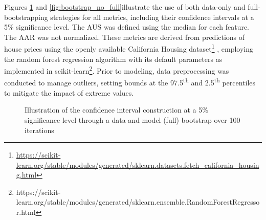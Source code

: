 Figures \ref{fig:bootstrap_full} and \ref{fig:bootstrap_no_full}illustrate the use of both data-only and full-bootstrapping strategies for all metrics, including their confidence intervals at a 5\% significance level. The AUS was defined using the median for each feature. The AAR was not normalized. These metrics are derived from predictions of house prices using the openly available California Housing dataset\footnote{\url{https://scikit-learn.org/stable/modules/generated/sklearn.datasets.fetch_california_housing.html}} , employing the random forest regression algorithm with its default parameters as implemented in scikit-learn\footnote{https://scikit-learn.org/stable/modules/generated/sklearn.ensemble.RandomForestRegressor.html}. Prior to modeling, data preprocessing was conducted to manage outliers, setting bounds at the 97.5\textsuperscript{th} and 2.5\textsuperscript{th} percentiles to mitigate the impact of extreme values. 


\begin{figure}[ht!]
\centering
  \caption{Illustration of the confidence interval construction at a 5\% significance level through a data and model (full) bootstrap over 100 iterations}
    \label{fig:bootstrap_full}
\end{figure}

